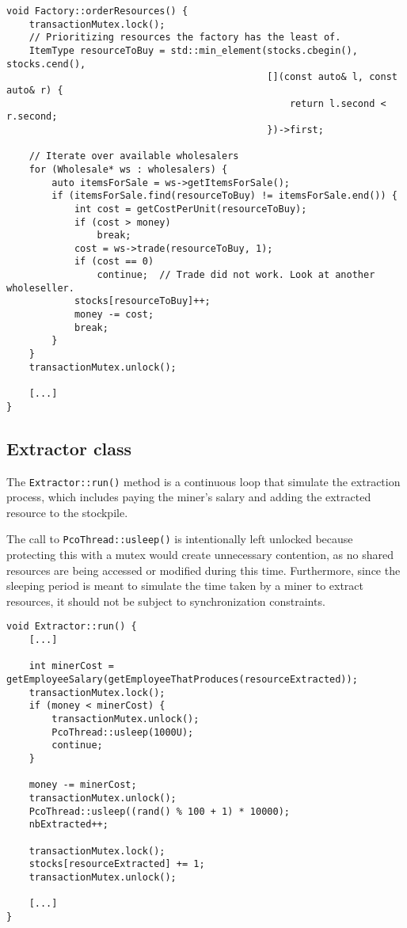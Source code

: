 \documentclass{article}
\begin{document}
    \begin{lstlisting}
void Factory::orderResources() {
    transactionMutex.lock();
    // Prioritizing resources the factory has the least of.
    ItemType resourceToBuy = std::min_element(stocks.cbegin(), stocks.cend(),
                                              [](const auto& l, const auto& r) {
                                                  return l.second < r.second;
                                              })->first;

    // Iterate over available wholesalers
    for (Wholesale* ws : wholesalers) {
        auto itemsForSale = ws->getItemsForSale();
        if (itemsForSale.find(resourceToBuy) != itemsForSale.end()) {
            int cost = getCostPerUnit(resourceToBuy);
            if (cost > money)
                break;
            cost = ws->trade(resourceToBuy, 1);
            if (cost == 0)
                continue;  // Trade did not work. Look at another wholeseller.
            stocks[resourceToBuy]++;
            money -= cost;
            break;
        }
    }
    transactionMutex.unlock();

    [...]
}
    \end{lstlisting}

    \subsection{Extractor class}

    The \texttt{Extractor::run()} method is a continuous loop that simulate the extraction process, which includes paying the miner's salary and adding the extracted resource to the stockpile.

    The call to \texttt{PcoThread::usleep()} is intentionally left unlocked because protecting this with a mutex would create unnecessary
    contention, as no shared resources are being accessed or modified during this time. Furthermore, since the sleeping period is
    meant to simulate the time taken by a miner to extract resources, it should not be subject to synchronization constraints.

    \begin{lstlisting}
void Extractor::run() {
    [...]

    int minerCost = getEmployeeSalary(getEmployeeThatProduces(resourceExtracted));
    transactionMutex.lock();
    if (money < minerCost) {
        transactionMutex.unlock();
        PcoThread::usleep(1000U);
        continue;
    }

    money -= minerCost;
    transactionMutex.unlock();
    PcoThread::usleep((rand() % 100 + 1) * 10000);
    nbExtracted++;

    transactionMutex.lock();
    stocks[resourceExtracted] += 1;
    transactionMutex.unlock();

    [...]
}
    \end{lstlisting}
\end{document}
